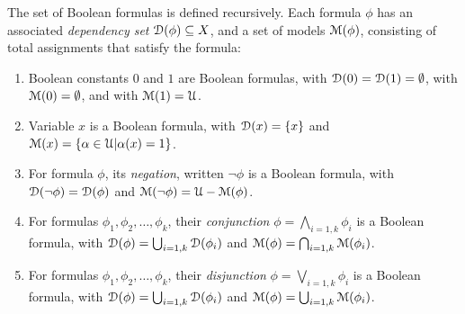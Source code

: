 \documentclass[letterpaper,USenglish,cleveref, autoref, thm-restate]{lipics-v2021}
\newcommand{\boolnot}{\neg}
\newcommand{\varset}{X}
\newcommand{\dependencyset}{{\cal D}}
\newcommand{\assign}{\alpha}
\newcommand{\uassign}{{\cal U}}
\newcommand{\modelset}{{\cal M}}
\begin{document}
\begin{definition}
  The set of Boolean formulas is defined recursively.  Each
  formula $\phi$ has an associated {\em dependency set}
  $\dependencyset(\phi)  \subseteq \varset$, and a set of models $\modelset(\phi)$,
  consisting of total assignments that satisfy the formula:
  \begin{enumerate}
  \item Boolean constants $0$ and $1$ are Boolean formulas,
    with $\dependencyset(0) = \dependencyset(1) = \emptyset$, with $\modelset(0) = \emptyset$, and with $\modelset(1) = \uassign$.
  \item Variable $x$ is a Boolean formula, with $\dependencyset(x) = \{x\}$
    and $\modelset(x) = \{\assign \in \uassign | \assign(x)=1\}$.
  \item For formula $\phi$, its {\em negation}, written $\boolnot \phi$ is a Boolean formula,
    with $\dependencyset(\boolnot \phi) = \dependencyset(\phi)$ and $\modelset(\boolnot \phi) = \uassign - \modelset(\phi)$.
  \item For formulas $\phi_1, \phi_2, \ldots, \phi_k$, their {\em conjunction} $\phi = \bigwedge_{i=1,k} \phi_i$ is a Boolean formula, with
      $\dependencyset(\phi) = \bigcup_{i=1,k} \dependencyset(\phi_i)$ and
      $\modelset(\phi) = \bigcap_{i=1,k} \modelset(\phi_i)$.
  \item For formulas $\phi_1, \phi_2, \ldots, \phi_k$, their {\em disjunction} $\phi = \bigvee_{i=1,k} \phi_i$ is a Boolean formula, with
      $\dependencyset(\phi) = \bigcup_{i=1,k} \dependencyset(\phi_i)$ and
      $\modelset(\phi) = \bigcup_{i=1,k} \modelset(\phi_i)$.
  \end{enumerate}
\label{def:boolean}
\end{definition}
  
\end{document}
